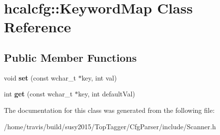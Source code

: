 \hypertarget{classhcalcfg_1_1KeywordMap}{\section{hcalcfg\-:\-:Keyword\-Map Class Reference}
\label{classhcalcfg_1_1KeywordMap}
}
\subsection*{Public Member Functions}
\begin{DoxyCompactItemize}
\item 
\hypertarget{classhcalcfg_1_1KeywordMap_aa4ea52d85eb56ee4eb463014618dabc1}{void {\bfseries set} (const wchar\-\_\-t $\ast$key, int val)}\label{classhcalcfg_1_1KeywordMap_aa4ea52d85eb56ee4eb463014618dabc1}

\item 
\hypertarget{classhcalcfg_1_1KeywordMap_a964e6f3248099709f52c76b3f4c049f4}{int {\bfseries get} (const wchar\-\_\-t $\ast$key, int default\-Val)}\label{classhcalcfg_1_1KeywordMap_a964e6f3248099709f52c76b3f4c049f4}

\end{DoxyCompactItemize}


The documentation for this class was generated from the following file\-:\begin{DoxyCompactItemize}
\item 
/home/travis/build/susy2015/\-Top\-Tagger/\-Cfg\-Parser/include/Scanner.\-h\end{DoxyCompactItemize}
